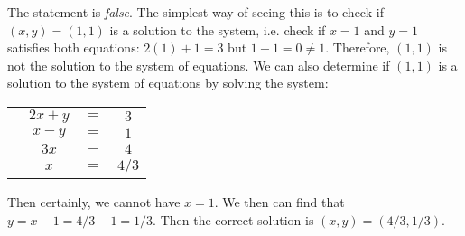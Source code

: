 \documentclass[11pt,letterpaper]{article}
\begin{document}
\sol The statement is \textit{false}. The simplest way of seeing this is to check if $(x,y)= (1,1)$ is a solution to the system, i.e. check if $x= 1$ and $y= 1$ satisfies both equations: $2(1) + 1= 3$ but $1 - 1= 0 \neq 1$. Therefore, $(1, 1)$ is not the solution to the system of equations. We can also determine if $(1, 1)$ is a solution to the system of equations by solving the system:
	\begin{table}[!ht]
	\centering
	\begin{tabular}{cccc}
	& $2x + y$ & $=$ & $3$ \\
	& $x - y$ & $=$ & $1$ \\ \hline
	& $3x$ & $=$ & $4$ \\
	& $x$ & $=$ & $4/3$ 
	\end{tabular}
	\end{table}
Then certainly, we cannot have $x= 1$. We then can find that $y= x - 1= 4/3 - 1= 1/3$. Then the correct solution is $(x, y)= (4/3, 1/3)$. 
\end{document}
